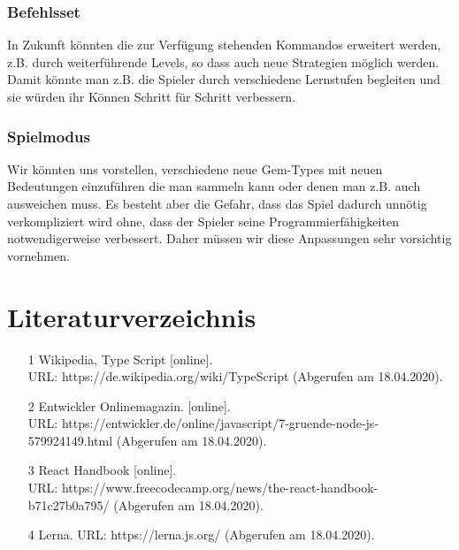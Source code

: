 \documentclass[11pt,a4paper,titlepage]{article}
\begin{document}
\subsubsection{Befehlsset}
In Zukunft könnten die zur Verfügung stehenden Kommandos erweitert werden, z.B. durch weiterführende Levels, so dass auch neue Strategien möglich werden. Damit könnte man z.B. die Spieler durch verschiedene Lernstufen begleiten und sie würden ihr Können Schritt für Schritt verbessern.

\subsubsection{Spielmodus}
Wir könnten uns vorstellen, verschiedene neue Gem-Types mit neuen Bedeutungen einzuführen die man sammeln kann oder denen man z.B. auch ausweichen muss. Es besteht aber die Gefahr, dass das Spiel dadurch unnötig verkompliziert wird ohne, dass der Spieler seine Programmierfähigkeiten notwendigerweise verbessert. Daher müssen wir diese Anpassungen sehr vorsichtig vornehmen.

\newpage

\section{Literaturverzeichnis}

\begin{itemize}
\item [1] Wikipedia, Type Script [online]. \\URL: https://de.wikipedia.org/wiki/TypeScript (Abgerufen am 18.04.2020).
\item [2] Entwickler Onlinemagazin.  [online]. \\URL: https://entwickler.de/online/javascript/7-gruende-node-js-579924149.html (Abgerufen am 18.04.2020).
\item [3] React Handbook [online]. \\URL: https://www.freecodecamp.org/news/the-react-handbook-b71c27b0a795/ (Abgerufen am 18.04.2020).
\item [4] Lerna. URL: https://lerna.js.org/ (Abgerufen am 18.04.2020).
\end{itemize}

\listoffigures
\end{document}
